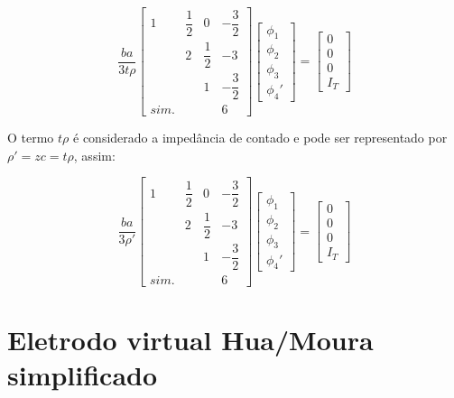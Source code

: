 \documentclass[
12pt,
a4paper,
oneside,
chapter=TITLE,
sumario=tradicional
]{abntex2}
\begin{document}
\begin{equation}
	\boxed{
	\frac{ba}{3t\rho}
	\begin{bmatrix}
		1 & \dfrac{1}{2} & 0 & -\dfrac{3}{2} \\
		& 2 & \dfrac{1}{2} & -3 \\
		&     & 1 & -\dfrac{3}{2} \\
	sim.	&     &     & 6
	\end{bmatrix}
	\begin{bmatrix}
		\phi_1 \\
		\phi_2 \\
		\phi_3 \\
		\phi_4'
	\end{bmatrix}
	=
	\begin{bmatrix}
		0 \\
		0 \\
		0 \\
		I_T
	\end{bmatrix}
	\label{eq:MEF_eq_0015}
    }
\end{equation}


O termo $t\rho$ é considerado a impedância de contado e pode ser representado por $\rho' = zc = t\rho$, assim: 

$$
\frac{ba}{3\rho'}
\begin{bmatrix}
	1 & \dfrac{1}{2} & 0 & -\dfrac{3}{2} \\
	& 2 & \dfrac{1}{2} & -3 \\
	&     & 1 & -\dfrac{3}{2} \\
	sim.	&     &     & 6
\end{bmatrix}
\begin{bmatrix}
	\phi_1 \\
	\phi_2 \\
	\phi_3 \\
	\phi_4'
\end{bmatrix}
=
\begin{bmatrix}
	0 \\
	0 \\
	0 \\
	I_T
\end{bmatrix}
$$

\begin{center}
\end{center}

\section{Eletrodo virtual Hua/Moura simplificado}
\end{document}
